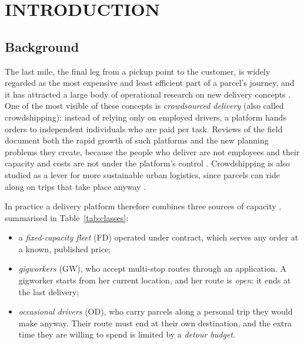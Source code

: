 \chapter{INTRODUCTION}
\label{ch:intro}

\section{Background}
\label{sec:background}

The last mile, the final leg from a pickup point to the customer, is widely
regarded as the most expensive and least efficient part of a parcel's
journey, and it has attracted a large body of operational research on new
delivery concepts \citep{boysen2021lastmile}. One of the most visible of
these concepts is \emph{crowdsourced delivery} (also called crowdshipping):
instead of relying only on employed drivers, a platform hands orders to
independent individuals who are paid per task. Reviews of the field document
both the rapid growth of such platforms and the new planning problems they
create, because the people who deliver are not employees and their capacity
and costs are not under the platform's control
\citep{alnaggar2021crowdsourced,savelsbergh2022challenges,savelsbergh2024update}.
Crowdshipping is also studied as a lever for more sustainable urban
logistics, since parcels can ride along on trips that take place anyway
\citep{mohri2023crowdshipping}.

In practice a delivery platform therefore combines three sources of
capacity \citep{archetti2016vrpod,luy2024workforce}, summarised in
Table~\ref{tab:classes}:
\begin{itemize}[leftmargin=*,itemsep=2pt]
\item a \emph{fixed-capacity fleet} (FD) operated under contract, which
serves any order at a known, published price;
\item \emph{gigworkers} (GW), who accept multi-stop routes through an
application. A gigworker starts from her current location, and her route is
\emph{open}: it ends at the last delivery;
\item \emph{occasional drivers} (OD), who carry parcels along a personal
trip they would make anyway. Their route must end at their own destination,
and the extra time they are willing to spend is limited by a \emph{detour
budget}.
\end{itemize}

